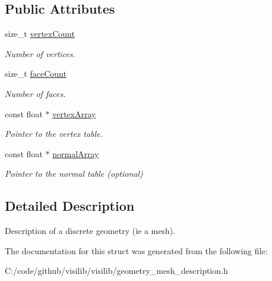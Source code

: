 \subsection*{Public Attributes}
\begin{DoxyCompactItemize}
\item 
\mbox{\label{structvisilib_1_1_geometry_discrete_mesh_description_a05af40870e65c9fb19a27ea6fac9aff1}} 
size\+\_\+t \mbox{\hyperlink{structvisilib_1_1_geometry_discrete_mesh_description_a05af40870e65c9fb19a27ea6fac9aff1}{vertex\+Count}}
\begin{DoxyCompactList}\small\item\em Number of vertices. \end{DoxyCompactList}\item 
\mbox{\label{structvisilib_1_1_geometry_discrete_mesh_description_a62095a1d44914be5e4876494c3301f1e}} 
size\+\_\+t \mbox{\hyperlink{structvisilib_1_1_geometry_discrete_mesh_description_a62095a1d44914be5e4876494c3301f1e}{face\+Count}}
\begin{DoxyCompactList}\small\item\em Number of faces. \end{DoxyCompactList}\item 
\mbox{\label{structvisilib_1_1_geometry_discrete_mesh_description_ac6f07aa7316e876d2405150af6cbf1f5}} 
const float $\ast$ \mbox{\hyperlink{structvisilib_1_1_geometry_discrete_mesh_description_ac6f07aa7316e876d2405150af6cbf1f5}{vertex\+Array}}
\begin{DoxyCompactList}\small\item\em Pointer to the vertex table. \end{DoxyCompactList}\item 
\mbox{\label{structvisilib_1_1_geometry_discrete_mesh_description_aaa05beffdab2fd2f4cf4ac28a86eaf3e}} 
const float $\ast$ \mbox{\hyperlink{structvisilib_1_1_geometry_discrete_mesh_description_aaa05beffdab2fd2f4cf4ac28a86eaf3e}{normal\+Array}}
\begin{DoxyCompactList}\small\item\em Pointer to the normal table (optional) \end{DoxyCompactList}\end{DoxyCompactItemize}


\subsection{Detailed Description}
Description of a discrete geometry (ie a mesh). 

The documentation for this struct was generated from the following file\+:\begin{DoxyCompactItemize}
\item 
C\+:/code/github/visilib/visilib/geometry\+\_\+mesh\+\_\+description.\+h\end{DoxyCompactItemize}
